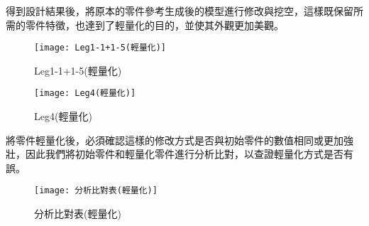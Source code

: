 得到設計結果後，將原本的零件參考生成後的模型進行修改與挖空，這樣既保留所需的零件特徵，也達到了輕量化的目的，並使其外觀更加美觀。\

\begin{figure}[htbp]
  \centering
  \begin{minipage}{0.45\textwidth}
    \centering
    \texttt{[image: Leg1-1+1-5(輕量化)]}
    \caption{Leg1-1+1-5(輕量化)}
    \label{Leg1-1+1-5(輕量化)}
  \end{minipage}
  \hfill
  \begin{minipage}{0.45\textwidth}
    \centering
    \texttt{[image: Leg4(輕量化)]}
    \caption{Leg4(輕量化)}
    \label{Leg4(輕量化)}
  \end{minipage}
  \end{figure}

將零件輕量化後，必須確認這樣的修改方式是否與初始零件的數值相同或更加強壯，因此我們將初始零件和輕量化零件進行分析比對，以查證輕量化方式是否有誤。\

\begin{figure}[hbt!]
\center
\texttt{[image: 分析比對表(輕量化)]}
\caption{\Large 分析比對表(輕量化)}
\label{分析比對表(輕量化)}
\end{figure}

\begin{table}[htb!]
  \center\large
  \caption{\Large leg1-1+1-5分析比對}
\end{table}

\begin{table}[htb!]
  \center\large
  \caption{\Large leg4分析比對}
\end{table}

